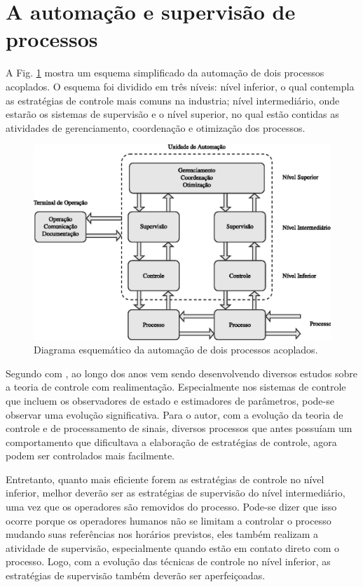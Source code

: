 \section{A automação e supervisão de processos}
A Fig. \ref{fig:esquema_automacao} mostra um esquema simplificado da automação
de dois processos acoplados. O esquema foi dividido em três níveis: nível
inferior, o qual contempla as estratégias de controle mais comuns na industria;
nível intermediário, onde estarão os sistemas de supervisão e o nível superior,
no qual estão contidas as atividades de gerenciamento, coordenação e otimização
dos processos.

\begin{figure}[!htb]
\centering
    \includegraphics{imgs/introducao/eps/esquema_automacao}
    \caption{Diagrama esquemático da automação de dois processos acoplados.}
    \label{fig:esquema_automacao}
\end{figure}

Segundo com , ao longo dos anos vem sendo
desenvolvendo diversos estudos sobre a teoria de controle com realimentação.
Especialmente nos sistemas de controle que incluem os observadores de estado e
estimadores de parâmetros, pode-se observar uma evolução significativa. Para o
autor, com a evolução da teoria de controle e de processamento de sinais,
diversos processos que antes possuíam um comportamento que dificultava a
elaboração de estratégias de controle, agora podem ser controlados mais
facilmente.

Entretanto, quanto mais eficiente forem as estratégias de controle no nível
inferior, melhor deverão ser as estratégias de supervisão do nível
intermediário, uma vez que os operadores são removidos do processo. Pode-se
dizer que isso ocorre porque os operadores humanos não se limitam a controlar o
processo mudando suas referências nos horários previstos, eles também realizam
a atividade de supervisão, especialmente quando estão em contato direto com o
processo. Logo, com a evolução das técnicas de controle no nível inferior, as
estratégias de supervisão também deverão ser aperfeiçoadas.

